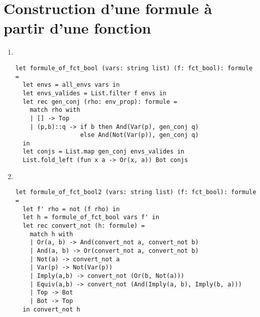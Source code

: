 \section{Construction d'une formule à partir d'une fonction}

\begin{enumerate}
	\item~
		\begin{lstlisting}[language=caml,caption=Déterminaison d'une formule dont l'interprétation est \texttt{f} sous forme \textsc{fnd}]
let formule_of_fct_bool (vars: string list) (f: fct_bool): formule =
  let envs = all_envs vars in
  let envs_valides = List.filter f envs in
  let rec gen_conj (rho: env_prop): formule =
    match rho with
    | [] -> Top
    | (p,b)::q -> if b then And(Var(p), gen_conj q)
                  else And(Not(Var(p)), gen_conj q)
  in
  let conjs = List.map gen_conj envs_valides in
  List.fold_left (fun x a -> Or(x, a)) Bot conjs
		\end{lstlisting}
	\item~
		\begin{lstlisting}[language=caml,caption=Déterminaison d'une formule dont l'interprétation est \texttt{f} sous forme \textsc{fnc}]
let formule_of_fct_bool2 (vars: string list) (f: fct_bool): formule =
  let f' rho = not (f rho) in
  let h = formule_of_fct_bool vars f' in
  let rec convert_not (h: formule) =
    match h with
    | Or(a, b) -> And(convert_not a, convert_not b)
    | And(a, b) -> Or(convert_not a, convert_not b)
    | Not(a) -> convert_not a
    | Var(p) -> Not(Var(p))
    | Imply(a,b) -> convert_not (Or(b, Not(a)))
    | Equiv(a,b) -> convert_not (And(Imply(a, b), Imply(b, a)))
    | Top -> Bot
    | Bot -> Top
  in convert_not h
		\end{lstlisting}
\end{enumerate}
